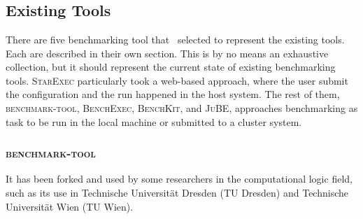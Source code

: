 \chapter{\chExisting}
\label{ch:existing}


\section{Existing Tools}


There are five benchmarking tool that \first~selected to represent the existing tools.
Each are described in their own section.
This is by no means an exhaustive collection, but it should represent the current state of existing benchmarking tools.
\textsc{StarExec} particularly took a web-based approach, where the user submit the configuration and the run happened in the host system.
The rest of them, \textsc{benchmark-tool}, \textsc{BenchExec}, \textsc{BenchKit}, and \textsc{JuBE}, approaches benchmarking as task to be run in the local machine or submitted to a cluster system.

\subsection{\textsc{benchmark-tool}}

It has been forked and used by some researchers in the computational logic field, such as its use in Technische Universit\"at Dresden (TU Dresden) and Technische Universit\"at Wien (TU Wien).


